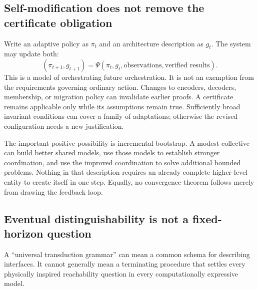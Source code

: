 \documentclass[11pt,a4paper]{article}
\theoremstyle{definition}
\theoremstyle{remark}
\begin{document}
\subsection{Self-modification does not remove the certificate obligation}
Write an adaptive policy as $\pi_t$ and an architecture description as $g_t$. The system may update both:
\[
 (\pi_{t+1},g_{t+1})=\Psi(\pi_t,g_t,\text{observations},\text{verified results}).
\]
This is a model of orchestrating future orchestration. It is not an exemption from the requirements governing ordinary action. Changes to encoders, decoders, membership, or migration policy can invalidate earlier proofs. A certificate remains applicable only while its assumptions remain true. Sufficiently broad invariant conditions can cover a family of adaptations; otherwise the revised configuration needs a new justification.

The important positive possibility is incremental bootstrap. A modest collective can build better shared models, use those models to establish stronger coordination, and use the improved coordination to solve additional bounded problems. Nothing in that description requires an already complete higher-level entity to create itself in one step. Equally, no convergence theorem follows merely from drawing the feedback loop.

\subsection{Eventual distinguishability is not a fixed-horizon question}
A ``universal transduction grammar'' can mean a common schema for describing interfaces. It cannot generally mean a terminating procedure that settles every physically inspired reachability question in every computationally expressive model.
\end{document}
